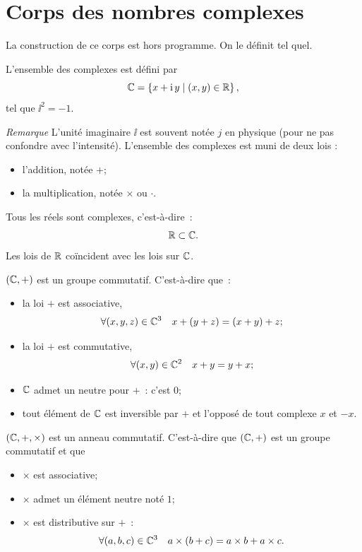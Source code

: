 \section{Corps des nombres complexes}
\label{sec:corpsdescomplexes}
La construction de ce corps est hors programme. On le définit tel quel.
\begin{defdef}
  L'ensemble des complexes est défini par
  \begin{equation}
    \mathbb{C} = \left\{x+ \operatorname{i} y\mathrel{}\middle|\mathrel{}(x,y)\in \mathbb{R}\right\},
  \end{equation}
  tel que \(\ii^2=-1\).
\end{defdef}
\emph{Remarque} L'unité imaginaire \(\ii\) est souvent notée \(j\) en physique (pour ne pas confondre avec l'intensité). L'ensemble des complexes est muni de deux lois :
\begin{itemize}
\item l'addition, notée \(+\);
\item la multiplication, notée \(\times\) ou \(\cdot\).
\end{itemize}
%
\begin{prop} Tous les réels sont complexes, c'est-à-dire~:
  \begin{equation}
    \mathbb{R} \subset \mathbb{C}.
  \end{equation}
  Les lois de \(\mathbb{R}\) coïncident avec les lois sur \(\mathbb{C}\).
\end{prop}
%
\begin{prop}
  \((\mathbb{C},+)\) est un groupe commutatif. C'est-à-dire que~:
  \begin{itemize}
  \item la loi \(+\) est associative,
    \begin{equation}
      \forall (x,y,z) \in \mathbb{C}^3 \quad x+(y+z)=(x+y)+z;
    \end{equation}
  \item la loi \(+\) est commutative,
    \begin{equation}
      \forall (x,y) \in \mathbb{C}^2 \quad x+y=y+x;
    \end{equation}
  \item \(\mathbb{C}\) admet un neutre pour \(+\)~: c'est \(0\);
  \item tout élément de \(\mathbb{C}\) est inversible par \(+\) et l'opposé de tout complexe \(x\) et \(-x\).
  \end{itemize}
\end{prop}
%
\begin{prop}
  \((\mathbb{C},+,\times)\) est un anneau commutatif. C'est-à-dire que \((\mathbb{C},+)\) est un groupe commutatif et que
  \begin{itemize}
  \item \(\times\) est associative;
  \item \(\times\) admet un élément neutre noté \(1\);
  \item \(\times\) est distributive sur \(+\)~:
    \begin{equation}
      \forall (a,b,c) \in \mathbb{C}^3 \quad a \times (b+c)=a \times b+ a \times c.
    \end{equation}
\end{itemize}
\end{prop}
